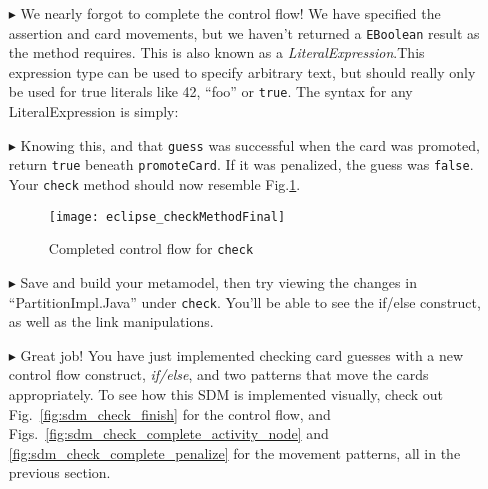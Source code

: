 \begin{itemize}
\clearpage

\item[$\blacktriangleright$] We nearly forgot to complete the control flow! We have specified the assertion and card movements, but we haven't returned a
\texttt{EBoolean} result as the method requires. This is also known as a \emph{LiteralExpression}.This expression type can be used to
specify arbitrary text, but should really only be used for true literals like 42, ``foo'' or \texttt{true}. The syntax for any LiteralExpression is simply:

\vspace{0.5cm}

\item[$\blacktriangleright$] Knowing this, and that \texttt{guess} was successful
when the card was promoted, return \texttt{true} beneath \texttt{promoteCard}. If it was penalized, the guess was \texttt{false}. Your \texttt{check} method
should now resemble Fig.\ref{fig:finalMethod}.

\vspace{0.5cm}

\begin{figure}[htbp]
\begin{center}
  \texttt{[image: eclipse\_checkMethodFinal]}
  \caption{Completed control flow for \texttt{check} \update}
  \label{fig:finalMethod}
\end{center}
\end{figure}

\item[$\blacktriangleright$] Save and build your metamodel, then try viewing the changes in ``PartitionImpl.Java'' under \texttt{check}. You'll be able to
see the if/else construct, as well as the link manipulations. 

\vspace{0.5cm}

\item[$\blacktriangleright$] Great job! You have just implemented checking card guesses with a new control flow construct, \emph{if/else}, and two patterns that
move the cards appropriately. To see how this SDM is implemented visually, check out Fig.~\ref{fig:sdm_check_finish} for the control flow, and
Figs.~\ref{fig:sdm_check_complete_activity_node} and \ref{fig:sdm_check_complete_penalize} for the movement patterns, all in the previous section.

\end{itemize}
 